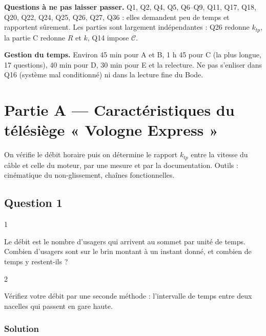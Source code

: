 \documentclass[11pt,a4paper]{article}
\begin{document}
\textbf{Questions à ne pas laisser passer.} Q1, Q2, Q4, Q5, Q6--Q9, Q11, Q17, Q18, Q20, Q22, Q24, Q25, Q26, Q27, Q36 : elles demandent peu de temps et rapportent sûrement. Les parties sont largement indépendantes : Q26 redonne \(k_{tp}\), la partie C redonne \(R\) et \(k\), Q14 impose \(\mathcal C\).

\textbf{Gestion du temps.} Environ 45 min pour A et B, 1 h 45 pour C (la plus longue, 17 questions), 40 min pour D, 30 min pour E et la relecture. Ne pas s'enliser dans Q16 (système mal conditionné) ni dans la lecture fine du Bode.

\hypertarget{partie-a-caractuxe9ristiques-du-tuxe9luxe9siuxe8ge-vologne-express}{%
\section{Partie A --- Caractéristiques du télésiège « Vologne Express »}\label{partie-a-caractuxe9ristiques-du-tuxe9luxe9siuxe8ge-vologne-express}}

On vérifie le débit horaire puis on détermine le rapport \(k_{tp}\) entre la vitesse du câble et celle du moteur, par une mesure et par la documentation. Outils : cinématique du non-glissement, chaînes fonctionnelles.

\hypertarget{question-1}{%
\subsection{Question 1}\label{question-1}}

\begin{indication}{1}

Le débit est le nombre d'usagers qui arrivent au sommet par unité de temps. Combien d'usagers sont sur le brin montant à un instant donné, et combien de temps y restent-ils ?

\end{indication}

\begin{indication}{2}

Vérifiez votre débit par une seconde méthode : l'intervalle de temps entre deux nacelles qui passent en gare haute.

\end{indication}

\hypertarget{solution}{%
\subsubsection{Solution}\label{solution}}
\end{document}
